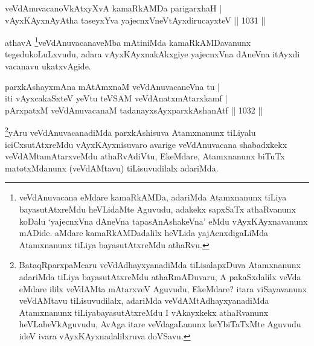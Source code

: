 
\begin{shl}
veVdAnuvacanoVkAtxyXvA kamaRkAMDa parigarxhaH |\\
vAyxKAyxnAyAtha taseyxYva yajecnxVneVtAyxdirucayxteV \hfill || 1031 ||
\end{shl}

\begin{artha}
athavA \footnote{veVdAnuvacana eMdare kamaRkAMDa, adariMda Atamxnanunx tiLiya bayasutAtxreMdu heVLidaMte Aguvudu, adakekx sapxSaTx athaRvanunx koDalu `yajecnxVna dAneVna tapasA\s nAshakeVna' eMdu vAyxKAyxnavanunx mADide. aMdare kamaRkAMDadalilx heVLida yajAcnxdigaLiMda Atamxnanunx tiLiya bayasutAtxreMdu athaRvu.}veVdAnuvacanaveMba mAtiniMda kamaRkAMDavanunx tegedukoLuLxvudu, adara vAyxKAyxnakAkxgiye yajecnxVna dAneVna itAyxdi vacanavu ukatxvAgide.
\end{artha}


\begin{shl}
parxkAshayxmAna mAtAmxnaM veVdAnuvacaneVna tu |\\
iti vAyxcakaSxteV yeVtu teVSAM veVdAnatxmAtarxkamf |\\
pArxpatxM veVdAnuvacanaM tadanayxsAyxparxkAshanAtf \hfill || 1032 ||
\end{shl}

\begin{artha}
\footnote{BataqRparxpaMcaru veVdAdhayxyanadiMda tiLisalapxDuva Atamxnanunx adariMda tiLiya bayasutAtxreMdu athaRmADuvaru, A pakaSxdalilx veVda eMdare ililx veVdAMta mAtarxveV Aguvudu, EkeMdare? itara viSayavanunx veVdAMtavu tiLisuvudilalx, adariMda veVdAMtAdhayxyanadiMda Atamxnanunx tiLiyabayasutAtxreMdu I vAkayxkekx athaRvanunx heVLabeVkAguvudu, AvAga itare veVdagaLanunx keYbiTaTxMte Aguvudu ideV ivara vAyxKAyxnadalilxruva doVSavu.}yAru veVdAnuvacanadiMda parxkAshisuva Atamxnanunx tiLiyalu iciCxsutAtxreMdu vAyxKAyxnisuvaro avarige veVdAnuvacana shabadxkekx veVdAMtamAtarxveMdu athaRvAdiVtu, EkeMdare, Atamxnanunx biTuTx matotxMdanunx (veVdAMtavu) tiLisuvudilalx adariMda.
\end{artha}




